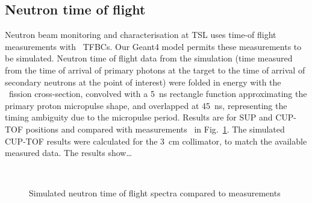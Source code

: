 \documentclass[11pt,a4paper]{IEEEtran}
\let\MYoriglatexcaption\caption
\renewcommand{\caption}[2][\relax]{\MYoriglatexcaption[#2]{#2}}
\def\U238{\BPChem{\^{238}U}}
\begin{document}
\subsection{Neutron time of flight}

Neutron beam monitoring and characterisation at TSL uses time-of flight measurements with \U238\ TFBCs.
Our Geant4 model permits these measurements to be simulated.
Neutron time of flight data from the simulation (time measured from the time of arrival of primary photons at the target to the time of arrival of secondary neutrons at the point of interest) were folded in energy with the \U238\ fission cross-section, convolved with a \SI{5}{\ns} rectangle function approximating the primary proton micropulse shape, and overlapped at \SI{45}{\ns}, representing the timing ambiguity due to the micropulse period.
Results are for SUP and CUP-TOF positions and compared with measurements~\cite{Prokofiev2009,Prokofiev14} in Fig.~\ref{fig:TOFSpectra}.
The simulated CUP-TOF results were calculated for the \SI{3}{\cm} collimator, to match the available measured data.
The results show\ldots{}

\begin{figure}[!t]
	\centering
	\\
    \caption{Simulated neutron time of flight spectra compared to measurements}
    \label{fig:TOFSpectra}
\end{figure}
\end{document}
